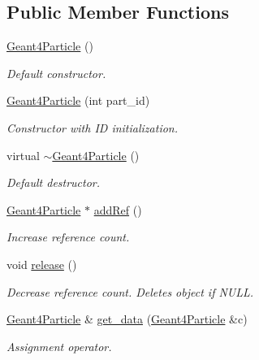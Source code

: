 \subsection*{Public Member Functions}
\begin{DoxyCompactItemize}
\item 
\hyperlink{class_d_d4hep_1_1_simulation_1_1_geant4_particle_a7fbf091b0805aeada441aa5850a8c660}{Geant4\+Particle} ()
\begin{DoxyCompactList}\small\item\em Default constructor. \end{DoxyCompactList}\item 
\hyperlink{class_d_d4hep_1_1_simulation_1_1_geant4_particle_a3fedeb9cf8f88104e7457305164145d8}{Geant4\+Particle} (int part\+\_\+id)
\begin{DoxyCompactList}\small\item\em Constructor with ID initialization. \end{DoxyCompactList}\item 
virtual \hyperlink{class_d_d4hep_1_1_simulation_1_1_geant4_particle_a6826af4b7518aeb0e2396eb7abaed67c}{$\sim$\+Geant4\+Particle} ()
\begin{DoxyCompactList}\small\item\em Default destructor. \end{DoxyCompactList}\item 
\hyperlink{class_d_d4hep_1_1_simulation_1_1_geant4_particle}{Geant4\+Particle} $\ast$ \hyperlink{class_d_d4hep_1_1_simulation_1_1_geant4_particle_a57fda35759c8768450ef1c7d5509c281}{add\+Ref} ()
\begin{DoxyCompactList}\small\item\em Increase reference count. \end{DoxyCompactList}\item 
void \hyperlink{class_d_d4hep_1_1_simulation_1_1_geant4_particle_a41e9f1e5d735616691cfbf1073e08bd2}{release} ()
\begin{DoxyCompactList}\small\item\em Decrease reference count. Deletes object if N\+U\+LL. \end{DoxyCompactList}\item 
\hyperlink{class_d_d4hep_1_1_simulation_1_1_geant4_particle}{Geant4\+Particle} \& \hyperlink{class_d_d4hep_1_1_simulation_1_1_geant4_particle_ac1991c4a882d0c4515baebb329215516}{get\+\_\+data} (\hyperlink{class_d_d4hep_1_1_simulation_1_1_geant4_particle}{Geant4\+Particle} \&c)
\begin{DoxyCompactList}\small\item\em Assignment operator. \end{DoxyCompactList}\item 

\end{DoxyCompactItemize}
